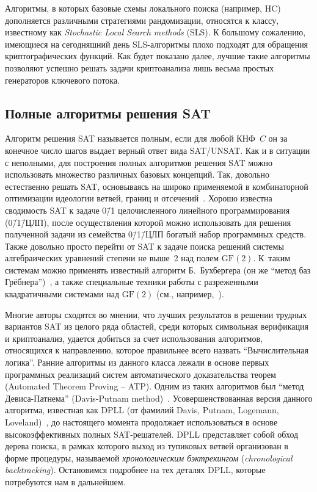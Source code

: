 Алгоритмы, в которых базовые схемы локального поиска (например, HC) дополняется различными стратегиями рандомизации, относятся к классу, известному как \textit{Stochastic Local Search methods} (SLS).
К большому сожалению, имеющиеся на сегодняшний день SLS-алгоритмы плохо подходят для обращения криптографических функций.
Как будет показано далее, лучшие такие алгоритмы позволяют успешно решать задачи криптоанализа лишь весьма простых генераторов ключевого потока.

\subsection{Полные алгоритмы решения SAT}

Алгоритм решения SAT называется полным, если для любой КНФ~$C$ он за конечное число шагов выдает верный ответ вида SAT/UNSAT.
Как и в ситуации с неполными, для построения полных алгоритмов решения SAT можно использовать множество различных базовых концепций.
Так, довольно естественно решать SAT, основываясь на широко применяемой в комбинаторной оптимизации идеологии ветвей, границ и отсечений~\cite{papadimitriou1982}.
Хорошо известна сводимость SAT к задаче 0\=/1 целочисленного линейного программирования (0\=/1\=/ЦЛП), после осуществления которой можно использовать для решения полученной задачи из семейства 0\=/1\=/ЦЛП богатый набор программных средств.
Также довольно просто перейти от SAT к задаче поиска решений системы алгебраических уравнений степени не выше~2 над полем $\mathrm{GF}(2)$.
К~таким системам можно применять известный алгоритм Б.~Бухбергера (он же \enquote{метод баз Грёбнера})~\cite{buchberger2006}, а также специальные техники работы с разреженными квадратичными системами над $\mathrm{GF}(2)$ (см., например,~\cite{goos1999,courtois2002}).

Многие авторы сходятся во мнении, что лучших результатов в решении трудных вариантов SAT из целого ряда областей, среди которых символьная верификация и криптоанализ, удается добиться за счет использования алгоритмов, относящихся к направлению, которое правильнее всего назвать \enquote{Вычислительная логика}.
Ранние алгоритмы из данного класса лежали в основе первых программных реализаций систем автоматического доказательства теорем (Automated Theorem Proving \--- ATP).
Одним из таких алгоритмов был \enquote{метод Девиса-Патнема} (Davis-Putnam method)~\cite{davis1960}.
Усовершенствованная версия данного алгоритма, известная как DPLL (от фамилий Davis, Putnam, Logemann, Loveland)~\cite{davis1967}, до настоящего момента продолжает использоваться в основе высокоэффективных полных SAT-решателей.
DPLL представляет собой обход дерева поиска, в рамках которого выход из тупиковых ветвей организован в форме процедуры, называемой \textit{хронологическим бэктрекингом} (\textit{chronological backtracking}).
Остановимся подробнее на тех деталях DPLL, которые потребуются нам в дальнейшем.

